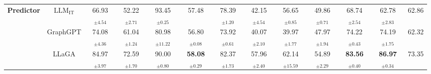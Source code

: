 \begin{table*}[!h]
{\begin{tabular}{cc|ccccccccccc}
      \multirow{3}{*}{\textbf{Predictor}} & $\text{LLM}_{\text{IT}}$ & 66.93$_{\pm \text{4.54}}$ & 52.22$_{\pm \text{2.71}}$ & 93.45$_{\pm \text{0.25}}$ & 57.48 & 78.39$_{\pm \text{1.20}}$ & 42.15$_{\pm \text{4.54}}$ & 56.65$_{\pm \text{0.85}}$ & 49.86$_{\pm \text{0.71}}$ & 68.74$_{\pm \text{2.54}}$ & 62.78$_{\pm \text{2.83}}$ & 62.86 \\ 
      & GraphGPT & 74.08$_{\pm \text{4.36}}$ & 61.04$_{\pm \text{1.24}}$ & 80.98$_{\pm \text{11.22}}$ & 56.80$_{\pm \text{0.08}}$ & 73.92$_{\pm \text{0.61}}$ & 40.07$_{\pm \text{2.10}}$ & 39.97$_{\pm \text{1.77}}$ & 47.97$_{\pm \text{1.94}}$ & 74.22$_{\pm \text{0.43}}$ & 74.19$_{\pm \text{1.75}}$ & 62.32 \\ 
      & LLaGA & 84.97$_{\pm \text{3.97}}$ & 72.59$_{\pm \text{1.70}}$ & 90.00$_{\pm \text{0.80}}$ & \cellcolor{orange!25} \textbf{58.08$_{\pm \text{0.29}}$} & 82.37$_{\pm \text{1.73}}$ & 57.96$_{\pm \text{2.40}}$ & 62.14$_{\pm \text{15.59}}$ & \cellcolor{orange!10} 54.89$_{\pm \text{2.29}}$ & \cellcolor{orange!25} \textbf{83.56$_{\pm \text{0.40}}$} & \cellcolor{orange!25} \textbf{86.97$_{\pm \text{0.34}}$} & \cellcolor{orange!10} 73.35 \\ \bottomrule
    \end{tabular}
    }
    \label{tab:mainexp_f1}
\end{table*}
